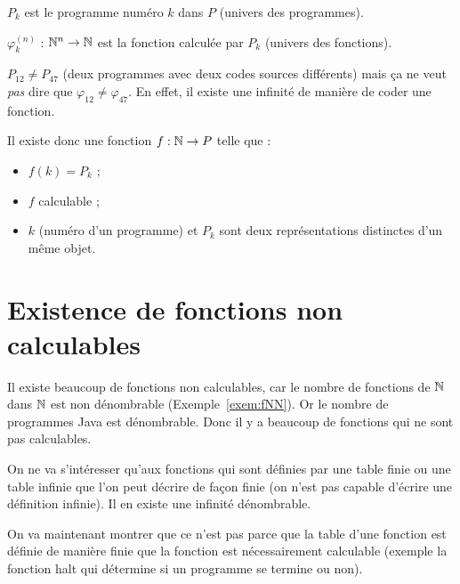 \begin{mydef}[$P_k$]
	$P_k$ est le programme numéro $k$ dans $P$ (univers des programmes).
\end{mydef}

\begin{mydef}[$\varphi^{(n)}_k$]
	$\varphi^{(n)}_k$ : $\mathbb{N}^n \rightarrow \mathbb{N}$ est la fonction calculée par $P_k$ (univers des fonctions).
\end{mydef}

\begin{myrem}
  $P_{12} \neq P_{47}$ (deux programmes avec deux codes sources différents) mais ça ne veut \emph{pas} dire que $\varphi_{12} \neq \varphi_{47}$. En effet, il existe une infinité de manière de coder une fonction.
\end{myrem}

\begin{myprop}
	Il existe donc une fonction $f : \mathbb{N}\rightarrow P$ telle que :
	\begin{itemize}
		\item $f(k) = P_k$ ;
		\item $f$ calculable ;
		\item $k$ (numéro d'un programme) et $P_k$ sont deux représentations
			distinctes d'un même objet.
	\end{itemize}
\end{myprop}


\section{Existence de fonctions non calculables}
\label{sec:existence_de_fonction_non_calculables}
Il existe beaucoup de fonctions non calculables, car le nombre de fonctions de $\mathbb{N}$ dans $\mathbb{N}$ est non dénombrable (Exemple~\ref{exem:fNN}).
Or le nombre de programmes Java est dénombrable.
Donc il y a beaucoup de fonctions qui ne sont pas calculables.

On ne va s'intéresser qu'aux fonctions qui sont définies par une table finie ou une table infinie que l'on peut décrire de façon finie (on n'est pas capable d'écrire une définition infinie). Il en existe une infinité dénombrable.

On va maintenant montrer que ce n'est pas parce que la table d'une fonction est définie de manière finie que la fonction est nécessairement calculable (exemple la fonction halt qui détermine si un programme se termine ou non).

